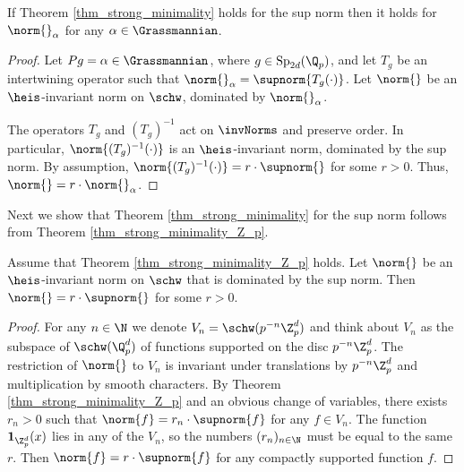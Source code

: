 \begin{prop}
If Theorem \ref{thm_strong_minimality} holds for the sup norm then it holds for $\norm{}_\alpha$ for any $\alpha\in\Grassmannian$.
\end{prop} 
    \begin{proof}
    Let $Pg=\alpha\in\Grassmannian$, where $g\in \mathrm{Sp}_{2d}(\Q_p)$, and let $T_g$ be an intertwining operator such that $\norm{}_\alpha=\supnorm{T_g(\cdot)}$.
    Let $\norm{}$ be an $\heis$-invariant norm on $\schw$, dominated by $\norm{}_\alpha$.
    
    The operators $T_g$ and $(T_g)^{-1}$ act on $\invNorms$ and preserve order.
    In particular, $\norm{(T_g)^{-1}(\cdot)}$ is an $\heis$-invariant norm, dominated by the sup norm.
    By assumption, $\norm{(T_g)^{-1}(\cdot)}=r\cdot \supnorm{}$ for some $r>0$.
    Thus, $\norm{}=r\cdot \norm{}_\alpha$.    
    \end{proof} 

Next we show that Theorem \ref{thm_strong_minimality} for the sup norm follows from Theorem \ref{thm_strong_minimality_Z_p}.
\begin{prop}
Assume that Theorem \ref{thm_strong_minimality_Z_p} holds.
Let $\norm{}$ be an $\heis$-invariant norm on $\schw$ that is dominated by the sup norm.
Then $\norm{}=r\cdot \supnorm{}$ for some $r>0$.
\end{prop} 
    \begin{proof}
    For any $n\in\N$ we denote $V_n=\schw(p^{-n}\Z_p^d)$ and think about $V_n$ as the subspace of $\schw(\Q_p^d)$ of functions supported on the disc $p^{-n}\Z_p^d$.
    The restriction of $\norm{}$ to $V_n$ is invariant under translations by $p^{-n}\Z_p^d$ and multiplication by smooth characters.
    By Theorem \ref{thm_strong_minimality_Z_p} and an obvious change of variables, there exists $r_n>0$ such that $\norm{f}=r_n\cdot\supnorm{f}$ for any $f\in V_n$.
    The function $\textbf{1}_{\Z_p^d}(x)$ lies in any of the $V_n$, so the numbers $(r_n)_{n\in\N}$ must be equal to the same $r$.
    Then $\norm{f}=r\cdot \supnorm{f}$ for any compactly supported function $f$.
    \end{proof}   
    
